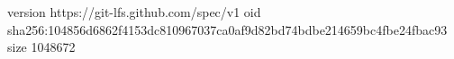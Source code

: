version https://git-lfs.github.com/spec/v1
oid sha256:104856d6862f4153dc810967037ca0af9d82bd74bdbe214659bc4fbe24fbac93
size 1048672
